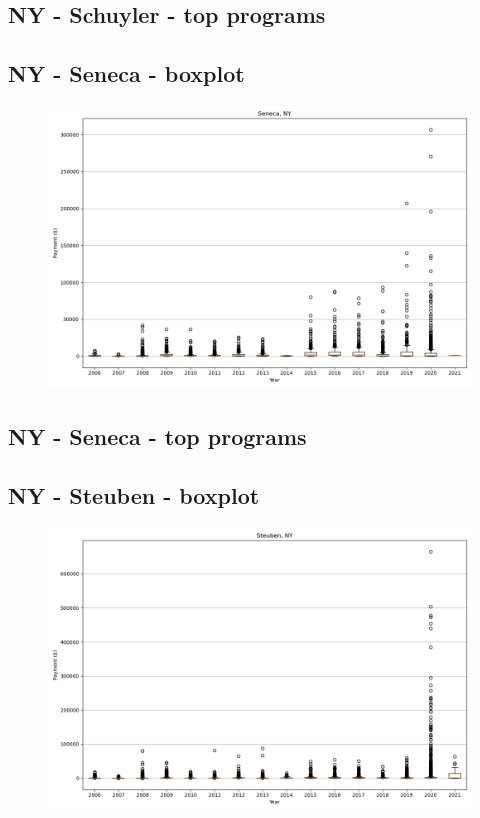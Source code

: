 \subsection*{NY - Schuyler - top programs}

\newpage
\subsection*{NY - Seneca - boxplot}
\begin{figure}[h]
\centering
\includegraphics[width=7in]{../output/boxplots/counties/Seneca-NY_boxplot.png}
\end{figure}


\subsection*{NY - Seneca - top programs}

\newpage
\subsection*{NY - Steuben - boxplot}
\begin{figure}[h]
\centering
\includegraphics[width=7in]{../output/boxplots/counties/Steuben-NY_boxplot.png}
\end{figure}



